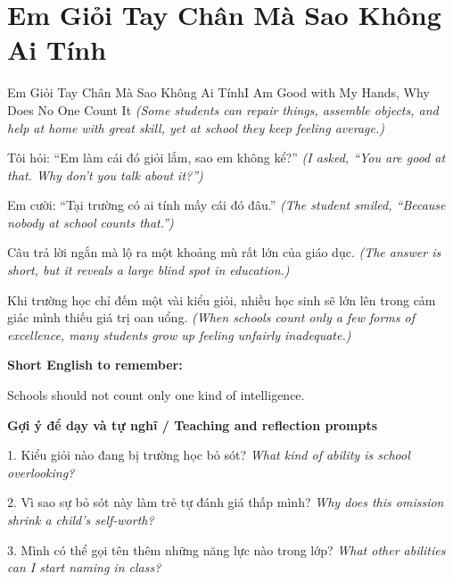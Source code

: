 \section{Em Giỏi Tay Chân Mà Sao Không Ai Tính}
\begin{truyen}{Em Giỏi Tay Chân Mà Sao Không Ai Tính}{I Am Good with My Hands, Why Does No One Count It}
\textit{(Some students can repair things, assemble objects, and help at home with great skill, yet at school they keep feeling average.)}

Tôi hỏi: “Em làm cái đó giỏi lắm, sao em không kể?”
\textit{(I asked, “You are good at that. Why don't you talk about it?”)}

Em cười: “Tại trường có ai tính mấy cái đó đâu.”
\textit{(The student smiled, “Because nobody at school counts that.”)}

Câu trả lời ngắn mà lộ ra một khoảng mù rất lớn của giáo dục.
\textit{(The answer is short, but it reveals a large blind spot in education.)}

\end{truyen}

\begin{baihoc}
Khi trường học chỉ đếm một vài kiểu giỏi, nhiều học sinh sẽ lớn lên trong cảm giác mình thiếu giá trị oan uổng.
\textit{(When schools count only a few forms of excellence, many students grow up feeling unfairly inadequate.)}
\end{baihoc}

\begin{ghinhoanh}
\textbf{Short English to remember:}

Schools should not count only one kind of intelligence.

\end{ghinhoanh}

\begin{tuhocnhanh}
\textbf{Gợi ý để dạy và tự nghĩ / Teaching and reflection prompts}

1. Kiểu giỏi nào đang bị trường học bỏ sót? \textit{What kind of ability is school overlooking?}

2. Vì sao sự bỏ sót này làm trẻ tự đánh giá thấp mình? \textit{Why does this omission shrink a child's self-worth?}

3. Mình có thể gọi tên thêm những năng lực nào trong lớp? \textit{What other abilities can I start naming in class?}
\end{tuhocnhanh}
\ngancach


